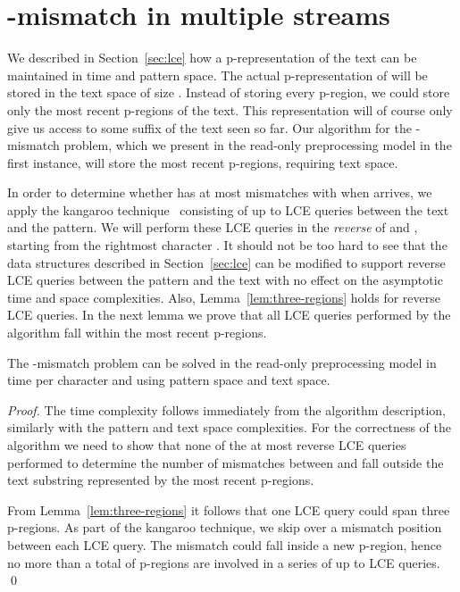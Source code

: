 \documentclass[envcountsame]{llncs}
\newcommand{\pregion}{\mbox{p-region}\xspace}
\newcommand{\pregions}{\mbox{p-regions}\xspace}
\newcommand{\prepresentation}{\mbox{p-representation}\xspace}
\begin{document}
\section{-mismatch in multiple streams}\label{sec:k-mismatch}

We described in Section~\ref{sec:lce} how a \prepresentation of the
text can be maintained in  time and  pattern space. The
actual \prepresentation of  will be stored in the text
space of size . Instead of storing every \pregion, we could
store only the most recent \pregions of the text. This representation
will of course only give us access to some suffix of the text seen so
far. Our algorithm for the -mismatch problem, which we present in the read-only preprocessing
model in the first instance, will store the most
recent  \pregions, requiring  text space.

In order to determine whether  has at most  mismatches with  when  arrives, we apply the kangaroo technique~\cite{LV:1985} consisting of up to  LCE queries between the text and the pattern. We will perform these LCE queries in the \emph{reverse} of  and , starting from the rightmost character . It should not be too hard to see that the data structures described in Section~\ref{sec:lce} can be modified to support reverse LCE queries between the pattern and the text with no effect on the asymptotic time and space complexities. Also, Lemma~\ref{lem:three-regions} holds for reverse LCE queries. In the next lemma we prove that all LCE queries performed by the algorithm fall within the  most recent \pregions.

\begin{lemma}
    \label{lem:k-mismatch}
    The -mismatch problem can be solved in the read-only
    preprocessing model in   time per character and using  pattern space and  text space.
\end{lemma}
\begin{proof}
    The time complexity follows immediately from the algorithm description, similarly with the pattern and text space complexities. For the correctness of the algorithm we need to show that none of the at most  reverse LCE queries performed to determine the number of mismatches between  and  fall outside the text substring represented by the  most recent \pregions.

    From Lemma~\ref{lem:three-regions} it follows that one LCE query could span three \pregions. As part of the kangaroo technique, we skip over a mismatch position between each LCE query. The mismatch could fall inside a new \pregion, hence no more than a total of  \pregions are involved in a series of up to  LCE queries.
    \qed
\end{proof}
\end{document}
